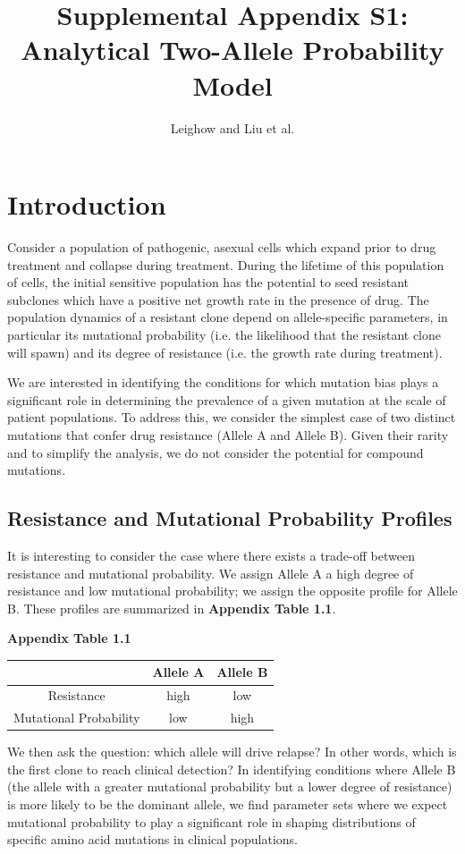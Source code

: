 \documentclass{article}
\title{Supplemental Appendix S1: \\
\large Analytical Two-Allele Probability Model}
\author{Leighow and Liu et al.}
\begin{document}
\maketitle


\section{Introduction}

Consider a population of pathogenic, asexual cells which expand prior to drug treatment and collapse during treatment.  During the lifetime of this population of cells, the initial sensitive population has the potential to seed resistant subclones which have a positive net growth rate in the presence of drug.  The population dynamics of a resistant clone depend on allele-specific parameters, in particular its mutational probability (i.e. the likelihood that the resistant clone will spawn) and its degree of resistance (i.e. the growth rate during treatment).

We are interested in identifying the conditions for which mutation bias plays a significant role in determining the prevalence of a given mutation at the scale of patient populations.  To address this, we consider the simplest case of two distinct mutations that confer drug resistance (Allele A and Allele B).  Given their rarity and to simplify the analysis, we do not consider the potential for compound mutations.


\subsection{Resistance and Mutational Probability Profiles}

It is interesting to consider the case where there exists a trade-off between resistance and mutational probability.  We assign Allele A a high degree of resistance and low mutational probability; we assign the opposite profile for Allele B.  These profiles are summarized in \textbf{Appendix Table 1.1}.

\begin{center}
\textbf{Appendix Table 1.1}

 \begin{tabular}{||c | c | c||} 
 \hline
   & Allele A & Allele B \\ [0.5ex] 
 \hline\hline
 Resistance & high & low \\ 
 \hline
 Mutational Probability & low & high \\
 \hline
\end{tabular}
\end{center}
  We then ask the question: which allele will drive relapse?  In other words, which is the first clone to reach clinical detection?  In identifying conditions where Allele B (the allele with a greater mutational probability but a lower degree of resistance) is more likely to be the dominant allele, we find parameter sets where we expect mutational probability to play a significant role in shaping distributions of specific amino acid mutations in clinical populations.
\end{document}
